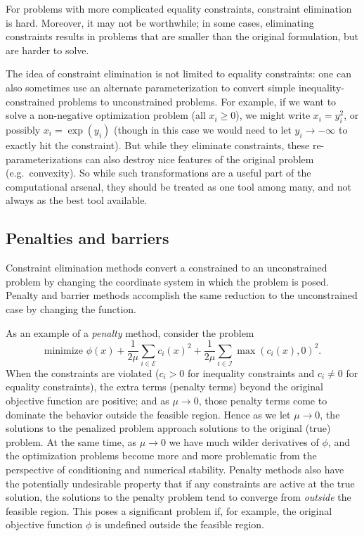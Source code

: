 \documentclass[12pt, leqno]{article} %
\begin{document}
For problems with more complicated equality constraints, constraint
elimination is hard.  Moreover, it may not be worthwhile; in some
cases, eliminating constraints results in problems that are smaller
than the original formulation, but are harder to solve.

The idea of constraint elimination is not limited to equality
constraints: one can also sometimes use an alternate parameterization
to convert simple inequality-constrained problems to unconstrained
problems.  For example, if we want to solve a non-negative
optimization problem (all $x_i \geq 0$), we might write $x_i = y_i^2$,
or possibly $x_i = \exp(y_i)$ (though in this case we would need to
let $y_i \rightarrow -\infty$ to exactly hit the constraint).  But
while they eliminate constraints, these re-parameterizations can also
destroy nice features of the original problem (e.g.~convexity).  So
while such transformations are a useful part of the computational
arsenal, they should be treated as one tool among many, and not always
as the best tool available.

\subsection*{Penalties and barriers}


Constraint elimination methods convert a constrained to an
unconstrained problem by changing the coordinate system in which the
problem is posed.  Penalty and barrier methods accomplish the same
reduction to the unconstrained case by changing the function.

As an example of a {\em penalty} method, consider the problem
\[
  \mbox{minimize } \phi(x) + \frac{1}{2\mu} \sum_{i\in \mathcal{E}}
  c_i(x)^2 + \frac{1}{2\mu} \sum_{i \in \mathcal{I}} \max(c_i(x),0)^2.
\]
When the constraints are violated ($c_i > 0$ for inequality
constraints and $c_i \neq 0$ for equality constraints), the extra
terms (penalty terms) beyond the original objective function are
positive; and as $\mu \rightarrow 0$, those penalty terms come to
dominate the behavior outside the feasible region.  Hence as we let
$\mu \rightarrow 0$, the solutions to the penalized problem approach
solutions to the original (true) problem.  At the same time, as $\mu
\rightarrow 0$ we have much wilder derivatives of $\phi$, and the
optimization problems become more and more problematic from the
perspective of conditioning and numerical stability.  Penalty methods
also have the potentially undesirable property that if any constraints
are active at the true solution, the solutions to the penalty problem
tend to converge from {\em outside} the feasible region.  This poses a
significant problem if, for example, the original objective function
$\phi$ is undefined outside the feasible region.
\end{document}
